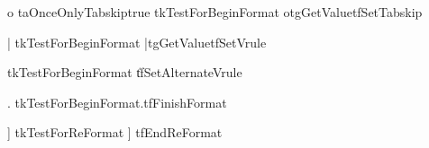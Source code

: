 \NewFormatKey o{%
  \!taOnceOnlyTabskiptrue
  \!tkTestForBeginFormat o{\!tgGetValue{\!tfSetTabskip}}}



\NewFormatKey |{%
  \!tkTestForBeginFormat |{\!tgGetValue{\!tfSetVrule}}}

\NewFormatKey \|{%
  \!tkTestForBeginFormat \|{\!tfSetAlternateVrule}}



\NewFormatKey .{%
  \!tkTestForBeginFormat.{\!tfFinishFormat}} 

\NewFormatKey {} 

\NewFormatKey ]{%
  \!tkTestForReFormat ] \!tfEndReFormat}



\def\!tkTestForBeginFormat#1#2{%
  \if!taBeginFormat  
    \def\!ttemp{#2}%
    \!thx \!ttemp    
  \else
    \toks0={#1}%
    \toks2=\!thx{\string\ReFormat}%
    \!thx \!tkImproperUse
  \fi}   

\def\!tkTestForReFormat#1#2{%
  \if!taBeginFormat  
    \toks0={#1}%
    \toks2=\!thx{\string\BeginFormat}%
    \!thx \!tkImproperUse
  \else
    \def\!ttemp{#2}%
    \!thx \!ttemp    
  \fi}   

\def\!tkImproperUse{%
  \!thError{\!thReadErrorMsg\!tkBadUseA "\the\toks0 "}%
    {\!thReadErrorMsg\!tkBadUseB \the\toks2 \space command.
    ^^J\!thReadErrorMsg\!tkBadKey}%
  \!tkReplaceKeyA}
 
